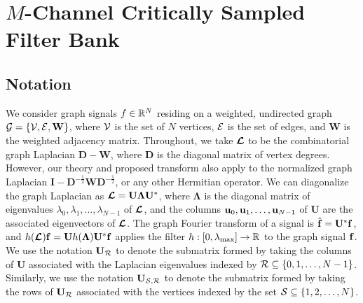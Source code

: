 \documentclass[journal, 10pt]{IEEEtran}
\begin{document}
\section{$M$-Channel Critically Sampled Filter Bank} \label{Se:fb_design}

\subsection{Notation}
We consider graph signals $f \in \mathbb{R}^N$ residing on a weighted, undirected graph ${\mathcal{G}}=\{{\mathcal{V}},{\mathcal{E}},\mathbf{W}\}$, where ${\mathcal{V}}$ is the set of $N$ vertices, ${\mathcal{E}}$ is the set of edges, and $\mathbf{W}$ is the weighted adjacency matrix. 
Throughout, we take $\boldsymbol{\mathcal{L}}$ to be the combinatorial graph Laplacian $\mathbf{D}-\mathbf{W}$, where $\mathbf{D}$ is the diagonal matrix of vertex degrees. However, our theory and proposed transform also apply to the normalized graph Laplacian $\mathbf{I}-\mathbf{D}^{-\frac{1}{2}}\mathbf{W}\mathbf{D}^{-\frac{1}{2}}$, or any other Hermitian operator. We can diagonalize the graph Laplacian as $\boldsymbol{\mathcal{L}}=\mathbf{U}{\boldsymbol \Lambda}\mathbf{U}^{*}$, where ${\boldsymbol \Lambda}$ is the diagonal matrix of eigenvalues $\lambda_0,\lambda_1,\ldots,\lambda_{N-1}$ of $\boldsymbol{\mathcal{L}}$, and the columns ${\bf u}_0,{\bf u}_1,\ldots,{\bf u}_{N-1}$ of $\mathbf{U}$ are the associated eigenvectors of $\boldsymbol{\mathcal{L}}$. The graph Fourier transform of a signal is $\hat{\bf{f}}=\mathbf{U}^{*}{\bf f}$, and ${h}(\boldsymbol{\mathcal{L}}){\bf f}=\mathbf{U}{h}({\boldsymbol \Lambda})\mathbf{U}^{*}{\bf f}$ applies the filter ${h}: [0,\lambda_{\max}] \rightarrow \mathbb{R}$ to the graph signal ${\bf f}$. We use the notation $\mathbf{U}_{{\cal R}}$ to denote the submatrix formed by taking the columns of $\mathbf{U}$ associated with the Laplacian eigenvalues indexed by ${\cal R} \subseteq \{0,1,\ldots,N-1\}$. Similarly, we use the notation $\mathbf{U}_{{\cal S},{\cal R}}$ to denote the submatrix  formed by taking the rows of $\mathbf{U}_{{\cal R}}$ associated with the vertices indexed by the set ${\cal S} \subseteq \{1,2,\ldots,N\}$.
\end{document}
